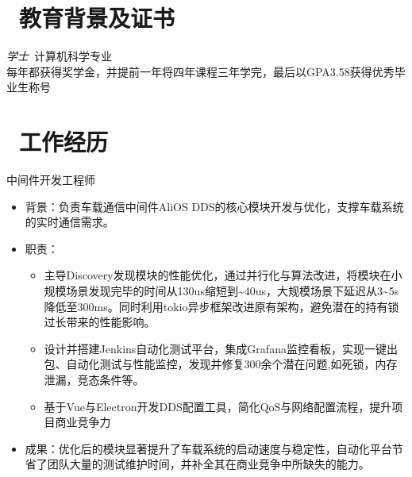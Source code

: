 \documentclass{resume}
\begin{document}


 
\section{\faGraduationCap\  教育背景及证书}
\textit{学士}\ 计算机科学专业 \\
每年都获得奖学金，并提前一年将四年课程三年学完，最后以GPA3.58获得优秀毕业生称号

\section{\faUsers\ 工作经历}
 \begin{onehalfspacing}
中间件开发工程师
\begin{itemize}
  \item 背景：负责车载通信中间件AliOS DDS的核心模块开发与优化，支撑车载系统的实时通信需求。
  \item 职责：
    \begin{itemize}
      \item 主导Discovery发现模块的性能优化，通过并行化与算法改进，将模块在小规模场景发现完毕的时间从130us缩短到\textasciitilde40us，大规模场景下延迟从3\textasciitilde5s降低至300ms。同时利用tokio异步框架改进原有架构，避免潜在的持有锁过长带来的性能影响。
      \item 设计并搭建Jenkins自动化测试平台，集成Grafana监控看板，实现一键出包、自动化测试与性能监控，发现并修复300余个潜在问题,如死锁，内存泄漏，竞态条件等。
      \item 基于Vue与Electron开发DDS配置工具，简化QoS与网络配置流程，提升项目商业竞争力
    \end{itemize}
  \item 成果：优化后的模块显著提升了车载系统的启动速度与稳定性，自动化平台节省了团队大量的测试维护时间，并补全其在商业竞争中所缺失的能力。
\end{itemize}
 \end{onehalfspacing}
\end{document}
